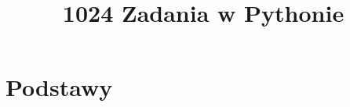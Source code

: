 \documentclass[11pt]{book}
\title{1024 Zadania w Pythonie}
\theoremstyle{definition}
\numberwithin{zad}{section}
\begin{document}
\maketitle
\tableofcontents

\chapter{Podstawy}
\end{document}
